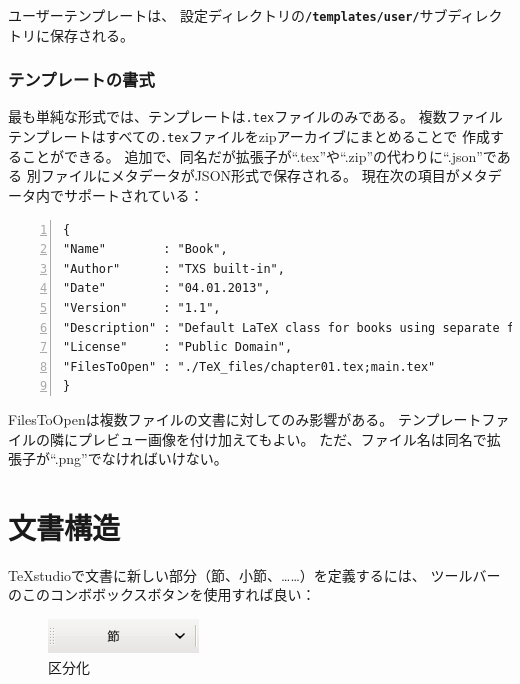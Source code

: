 ユーザーテンプレートは、
設定ディレクトリの\textbf{\texttt{/templates/user/}}サブディレクトリに保存される。

\subsubsection{テンプレートの書式}\label{sec:templateformat}

最も単純な形式では、テンプレートは\texttt{.tex}ファイルのみである。
複数ファイルテンプレートはすべての\texttt{.tex}ファイルをzipアーカイブにまとめることで
作成することができる。
追加で、同名だが拡張子が``.tex''や``.zip''の代わりに``.json''である
別ファイルにメタデータがJSON形式で保存される。
現在次の項目がメタデータ内でサポートされている：

\begin{lstlisting}[frame=single,breaklines=true,numbers=left]
{
"Name"        : "Book",
"Author"      : "TXS built-in",
"Date"        : "04.01.2013",
"Version"     : "1.1",
"Description" : "Default LaTeX class for books using separate files for each chapter.",
"License"     : "Public Domain",
"FilesToOpen" : "./TeX_files/chapter01.tex;main.tex"
}
\end{lstlisting}

FilesToOpenは複数ファイルの文書に対してのみ影響がある。
テンプレートファイルの隣にプレビュー画像を付け加えてもよい。
ただ、ファイル名は同名で拡張子が``.png''でなければいけない。

\section{文書構造}

TeXstudioで文書に新しい部分（節、小節、……）を定義するには、
ツールバーのこのコンボボックスボタンを使用すれば良い：

\begin{figure}[H]
  \centering
  \includegraphics{doc3.png}
  \caption{区分化}
\end{figure}




